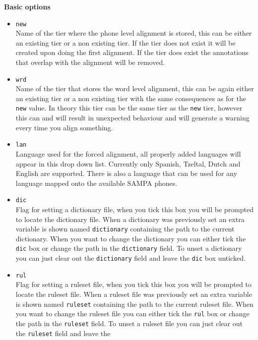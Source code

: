 \begin{itemize}
		\textbf{Basic options}	
		\begin{itemize}
			\item \texttt{new}\\
				Name of the tier where the phone level alignment is stored, this can be
				either an existing tier or a non existing tier. If the tier does not
				exist it will be created upon doing the first alignment. If the tier
				does exist the annotations that overlap with the alignment will be
				removed.
			\item \texttt{wrd}\\
				Name of the tier that stores the word level alignment, this can be
				again either an existing tier or a non existing tier with the same
				consequences as for the \texttt{new} value. In theory this tier can be
				the same tier as the \texttt{new} tier, however this can and will
				result in unexpected behaviour and will generate a warning every time
				you align something.
			\item \texttt{lan}\\
				Language used for the forced alignment, all properly added languages
				will appear in this drop down list. Currently only Spanish, Tzeltal,
				Dutch and English are supported. There is also a language that can be
				used for any language mapped onto the available SAMPA phones.
			\item \texttt{dic}\\
				Flag for setting a dictionary file, when you tick this box you
				will be prompted to locate the dictionary file. When a dictionary was
				previously set an extra variable is shown named \texttt{dictionary}
				containing the path to the current dictionary. When you want to change
				the dictionary you can either tick the \texttt{dic} box or change the
				path in the \texttt{dictionary} field. To unset a dictionary you can
				just clear out the \texttt{dictionary} field and leave the \texttt{dic}
				box unticked.
			\item \texttt{rul}\\
				Flag for setting a ruleset file, when you tick this box you will be
				prompted to locate the ruleset file. When a ruleset file was
				previously set an extra variable is shown named \texttt{ruleset}
				containing the path to the current ruleset file. When you want to
				change the ruleset file you can either tick the \texttt{rul} box or
				change the path in the \texttt{ruleset} field. To unset a ruleset file
				you can just clear out the \texttt{ruleset} field and leave the

\end{itemize}
\end{itemize}
